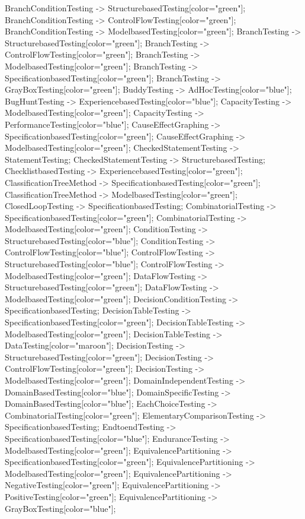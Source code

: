 \documentclass{article}
\begin{document}
{BranchConditionTesting -> StructurebasedTesting[color="green"];
BranchConditionTesting -> ControlFlowTesting[color="green"];
BranchConditionTesting -> ModelbasedTesting[color="green"];
BranchTesting -> StructurebasedTesting[color="green"];
BranchTesting -> ControlFlowTesting[color="green"];
BranchTesting -> ModelbasedTesting[color="green"];
BranchTesting -> SpecificationbasedTesting[color="green"];
BranchTesting -> GrayBoxTesting[color="green"];
BuddyTesting -> AdHocTesting[color="blue"];
BugHuntTesting -> ExperiencebasedTesting[color="blue"];
CapacityTesting -> ModelbasedTesting[color="green"];
CapacityTesting -> PerformanceTesting[color="blue"];
CauseEffectGraphing -> SpecificationbasedTesting[color="green"];
CauseEffectGraphing -> ModelbasedTesting[color="green"];
CheckedStatementTesting -> StatementTesting;
CheckedStatementTesting -> StructurebasedTesting;
ChecklistbasedTesting -> ExperiencebasedTesting[color="green"];
ClassificationTreeMethod -> SpecificationbasedTesting[color="green"];
ClassificationTreeMethod -> ModelbasedTesting[color="green"];
ClosedLoopTesting -> SpecificationbasedTesting;
CombinatorialTesting -> SpecificationbasedTesting[color="green"];
CombinatorialTesting -> ModelbasedTesting[color="green"];
ConditionTesting -> StructurebasedTesting[color="blue"];
ConditionTesting -> ControlFlowTesting[color="blue"];
ControlFlowTesting -> StructurebasedTesting[color="blue"];
ControlFlowTesting -> ModelbasedTesting[color="green"];
DataFlowTesting -> StructurebasedTesting[color="green"];
DataFlowTesting -> ModelbasedTesting[color="green"];
DecisionConditionTesting -> SpecificationbasedTesting;
DecisionTableTesting -> SpecificationbasedTesting[color="green"];
DecisionTableTesting -> ModelbasedTesting[color="green"];
DecisionTableTesting -> DataTesting[color="maroon"];
DecisionTesting -> StructurebasedTesting[color="green"];
DecisionTesting -> ControlFlowTesting[color="green"];
DecisionTesting -> ModelbasedTesting[color="green"];
DomainIndependentTesting -> DomainBasedTesting[color="blue"];
DomainSpecificTesting -> DomainBasedTesting[color="blue"];
EachChoiceTesting -> CombinatorialTesting[color="green"];
ElementaryComparisonTesting -> SpecificationbasedTesting;
EndtoendTesting -> SpecificationbasedTesting[color="blue"];
EnduranceTesting -> ModelbasedTesting[color="green"];
EquivalencePartitioning -> SpecificationbasedTesting[color="green"];
EquivalencePartitioning -> ModelbasedTesting[color="green"];
EquivalencePartitioning -> NegativeTesting[color="green"];
EquivalencePartitioning -> PositiveTesting[color="green"];
EquivalencePartitioning -> GrayBoxTesting[color="blue"];
}
\end{document}
